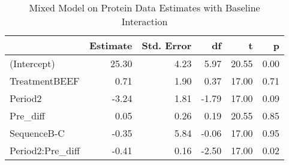\begin{table}[hbt]

\caption{\label{tab:proteinDataEstimates}Mixed Model on Protein Data Estimates with Baseline Interaction}
\centering
\begin{tabular}[t]{>{}l|rrrrr}
\toprule
 & Estimate & Std. Error & df & t & p\\
\midrule
(Intercept) & 25.30 & 4.23 & 5.97 & 20.55 & 0.00\\
TreatmentBEEF & 0.71 & 1.90 & 0.37 & 17.00 & 0.71\\
Period2 & -3.24 & 1.81 & -1.79 & 17.00 & 0.09\\
Pre\_diff & 0.05 & 0.26 & 0.19 & 20.55 & 0.85\\
SequenceB-C & -0.35 & 5.84 & -0.06 & 17.00 & 0.95\\
Period2:Pre\_diff & -0.41 & 0.16 & -2.50 & 17.00 & 0.02\\
\bottomrule
\end{tabular}
\end{table}
